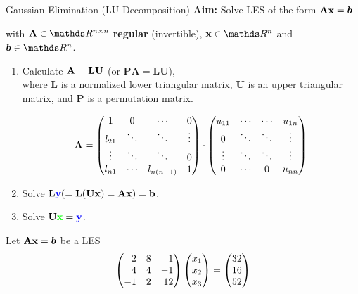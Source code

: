 \documentclass[11pt,compress,t,notes=noshow, xcolor=table]{beamer}
\begin{document}

\begin{vbframe}{Gaussian Elimination (LU Decomposition)}
\textbf{Aim:} Solve LES of the form $\mathbf{A} \mathbf{x} = \boldsymbol{b}$\\
\medskip

with $\Amat \in \R^{n \times n}$ \textbf{regular} (invertible), $\xv \in \R^n$ and $\boldsymbol{b} \in \R^n$.

\begin{enumerate}
\item Calculate $\mathbf{A} = \mathbf{LU}$ (or $\mathbf{PA} = \mathbf{LU}$), \\
  where $\mathbf{L}$ is a normalized lower triangular matrix, $\mathbf{U}$ is an upper triangular matrix, and $\mathbf{P}$ is a permutation matrix.

\begin{footnotesize}
$$
\mathbf{A} = \begin{pmatrix} 
1       & 0     & \cdots  & 0 \\
l_{21}  & \ddots& \ddots  & \vdots \\
\vdots  & \ddots& \ddots  & 0 \\
l_{n1}  & \cdots& l_{n(n-1)}  & 1  \end{pmatrix} \cdot
\begin{pmatrix} 
u_{11}  & \cdots  & \cdots & u_{1n} \\
0       & \ddots  & \ddots & \vdots \\
\vdots  & \ddots  & \ddots  & \vdots \\
0       & \cdots  & 0       & u_{nn}  \end{pmatrix}$$
\end{footnotesize}

\item Solve  $\mathbf{L}\textcolor{blue}{\textbf{y}} ( = \mathbf{L(Ux)} = \mathbf{Ax}) = \mathbf{b}$.
\item Solve  $\mathbf{U}\textcolor{green}{\textbf{x}} = \textcolor{blue}{\textbf{y}}$.
\end{enumerate}



\framebreak

Let $\mathbf{A} \mathbf{x} = \boldsymbol{b}$ be a LES
$$
\begin{pmatrix*}[r]
2 & 8 & 1 \\
4 & 4 & -1 \\
-1 & 2 & 12\end{pmatrix*}
\mat{
x_1 \\ x_2 \\ x_3
\end{pmatrix} = \begin{pmatrix}
32 \\ 16 \\ 52 }
$$


\end{vbframe}
\end{document}
